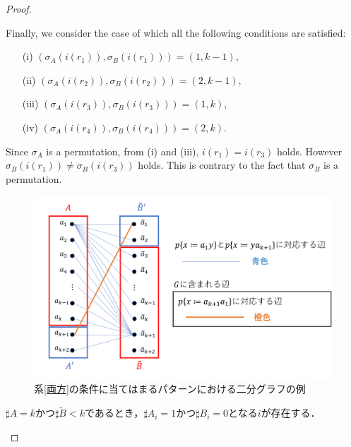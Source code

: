 \begin{proof}
\begin{enumerate}
\begin{enumerate}
Finally, we consider the case of which all the following conditions are satisfied:

\begin{enumerate}
\item[(i)] $(\sigma_{A}(i(r_{1})), \sigma_{B}(i(r_{1}))) = (1, k - 1)$,
\item[(ii)] $(\sigma_{A}(i(r_{2})), \sigma_{B}(i(r_{2}))) = (2, k - 1)$,
\item[(iii)] $(\sigma_{A}(i(r_{3})), \sigma_{B}(i(r_{3}))) = (1, k)$,
\item[(iv)] $(\sigma_{A}(i(r_{4})), \sigma_{B}(i(r_{4}))) = (2, k)$.
\end{enumerate}

Since $\sigma_{A}$ is a permutation, from (i) and (iii), $i(r_{1}) = i(r_{3})$ holds.
However $\sigma_{B}(i(r_{1})) \not= \sigma_{B}(i(r_{3}))$ holds.
This is contrary to the fact that $\sigma_{B}$ is a permutation.

\begin{figure}[t]
\centering
\includegraphics[width=\linewidth]{figs/Exam-BipartiteGraph-Corollary.png}
\caption{系\ref{両方}の条件に当てはまるパターンにおける二分グラフの例}
\label{系との関係}
\end{figure}

\smallskip

$\sharp A = k$かつ$\sharp \tilde{B} < k$であるとき，$\sharp A_{i}=1$かつ$\sharp B_{i}=0$となる$i$が存在する．


\end{enumerate}
\end{enumerate}
\end{proof}
